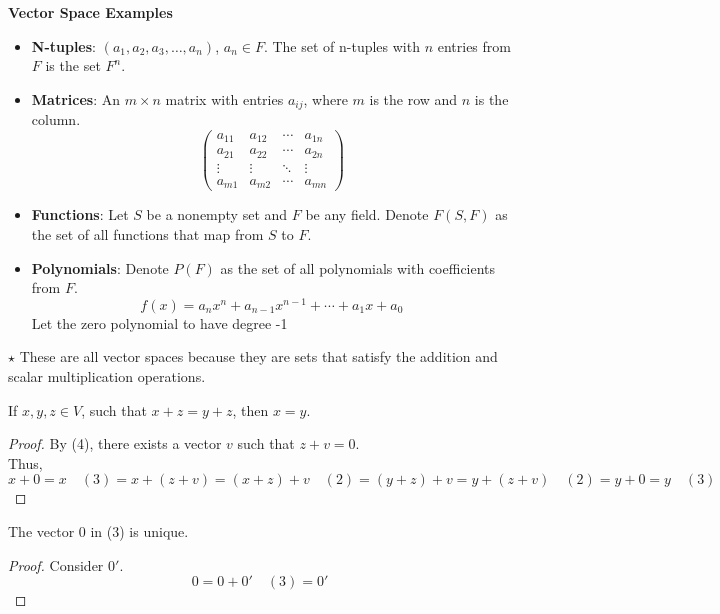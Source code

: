 \documentclass{article}
\begin{document}
\textbf{Vector Space Examples}
\begin{itemize}
    \item \textbf{N-tuples}: $(a_1, a_2, a_3, \ldots, a_n)$, $a_n \in F$. The set of n-tuples with $n$ entries from $F$ is the set $F^n$.
    \item \textbf{Matrices}: An $m \times n$ matrix with entries $a_{ij}$, where $m$ is the row and $n$ is the column.\\
    \[
    \begin{pmatrix}
        a_{11} & a_{12} & \cdots & a_{1n} \\
        a_{21} & a_{22} & \cdots & a_{2n} \\
        \vdots & \vdots & \ddots & \vdots \\ 
        a_{m1} & a_{m2} & \cdots & a_{mn}
    \end{pmatrix}
    \]
    \item \textbf{Functions}: Let $S$ be a nonempty set and $F$ be any field. Denote $F(S, F)$ as the set of all functions that map from $S$ to $F$.
    \item \textbf{Polynomials}: Denote $P(F)$ as the set of all polynomials with coefficients from $F$.
    \[
        f(x) = a_nx^n + a_{n-1}x^{n-1} + \cdots + a_1 x + a_0
    \]
    Let the zero polynomial to have degree -1
\end{itemize}

$\star$ These are all vector spaces because they are sets that satisfy the addition and scalar multiplication operations.

\begin{theorem}
If $x, y, z \in V$, such that $x + z = y + z$, then $x = y$.
\end{theorem}

\begin{proof}
    By (4), there exists a vector $v$ such that $z + v = 0$. \\
    Thus,
    \[
    x + 0 = x \quad (3) = x + (z + v) = (x + z) + v \quad (2) = (y + z) + v = y + (z + v) \quad (2) = y + 0 = y \quad (3)
    \]
\end{proof}

\begin{corollary}
The vector $0$ in (3) is unique.
\end{corollary}

\begin{proof}
    Consider $0'$.
    \[
    0 = 0 + 0' \quad (3) = 0'
    \]
\end{proof}
\end{document}
